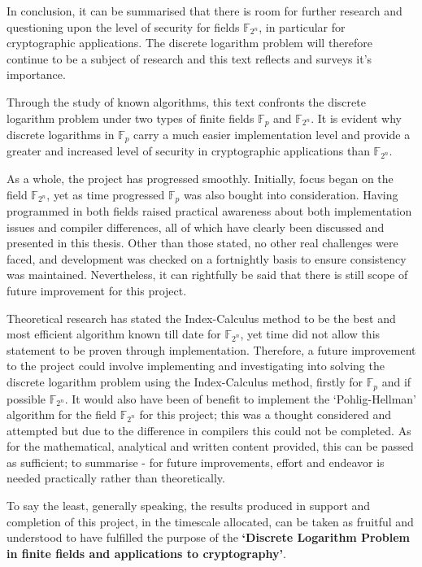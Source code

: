 \documentclass[iwp,first]{luthesis}
\begin{document}
In conclusion, it can be summarised that there is room for further research and questioning upon the level of security for fields $\mathbb{F}_{2^n}$, in particular for cryptographic applications. The discrete logarithm problem will therefore continue to be a subject of research and this text reflects and surveys it's importance.

Through the study of known algorithms, this text confronts the discrete logarithm problem under two types of finite fields $\mathbb{F}_p$ and $\mathbb{F}_{2^n}$. It is evident why discrete logarithms in $\mathbb{F}_p$ carry a much easier implementation level and provide a greater and increased level of security in cryptographic applications than $\mathbb{F}_{2^n}$.

As a whole, the project has progressed smoothly. Initially, focus began on the field $\mathbb{F}_{2^n}$, yet as time progressed $\mathbb{F}_p$ was also bought into consideration. Having programmed in both fields raised practical awareness about both implementation issues and compiler differences, all of which have clearly been discussed and presented in this thesis. Other than those stated, no other real challenges were faced, and development was checked on a fortnightly basis to ensure consistency was maintained. Nevertheless, it can rightfully be said that there is still scope of future improvement for this project.

Theoretical research has stated the Index-Calculus method to be the best and most efficient algorithm known till date for $\mathbb{F}_{2^n}$, yet time did not allow this statement to be proven through implementation. Therefore, a future improvement to the project could involve implementing and investigating into solving the discrete logarithm problem using the Index-Calculus method, firstly for $\mathbb{F}_p$ and if possible $\mathbb{F}_{2^n}$. It would also have been of benefit to implement the `Pohlig-Hellman' algorithm for the field $\mathbb{F}_{2^n}$ for this project; this was a thought considered and attempted but due to the difference in compilers this could not be completed. As for the mathematical, analytical and written content provided, this can be passed as sufficient; to summarise - for future improvements, effort and endeavor is needed practically rather than theoretically.

To say the least, generally speaking, the results produced in support and completion of this project, in the timescale allocated, can be taken as fruitful and understood to have fulfilled the purpose of the \textbf{`Discrete Logarithm Problem in finite fields and applications to cryptography'}.
\end{document}
